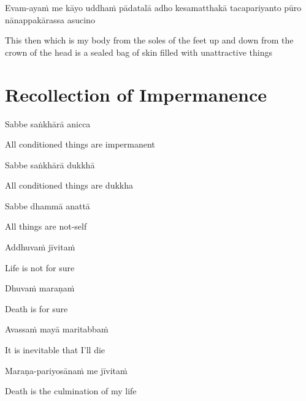 Evam-ayaṁ me kāyo uddhaṁ pādatalā adho kesamatthakā tacapariyanto pūro nānappakārassa asucino

\begin{english}
  This then which is my body from the soles of the feet up and down from the crown of the head is a sealed bag of skin filled with unattractive things
\end{english}

\suttaRef{[DN 22]}

\clearpage

\section{Recollection of Impermanence}

\begin{leader}
\end{leader}

Sabbe saṅkhārā anicca

\begin{english}
  All conditioned things are impermanent
\end{english}

Sabbe saṅkhārā dukkhā

\begin{english}
  All conditioned things are dukkha
\end{english}

Sabbe dhammā anattā

\begin{english}
  All things are not-self
\end{english}

\suttaRef{[Dhp 277-279]}

Addhuvaṁ jīvitaṁ

\begin{english}
  Life is not for sure
\end{english}

Dhuvaṁ maraṇaṁ

\begin{english}
  Death is for sure
\end{english}

Avassaṁ mayā maritabbaṁ

\begin{english}
  It is inevitable that I’ll die
\end{english}

Maraṇa-pariyosānaṁ me jīvitaṁ

\begin{english}
  Death is the culmination of my life
\end{english}

